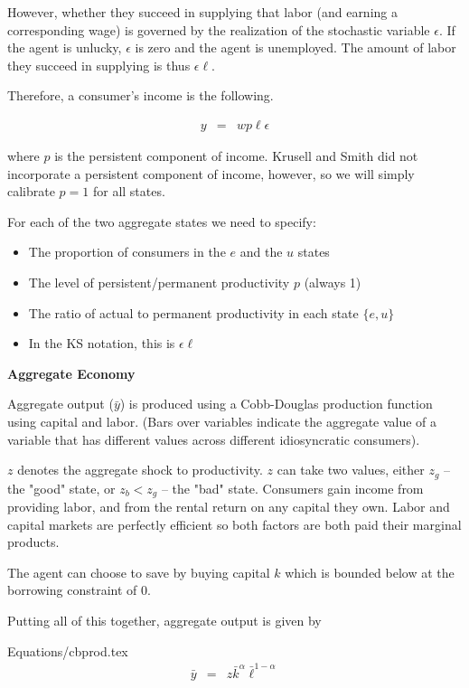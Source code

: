 \documentclass[titlepage]{\econtex}\providecommand{\texname}{KrusellSmithRep}%
\providecommand{\EqDir}{Equations}
\begin{document}
However, whether they succeed in supplying that labor (and earning a corresponding wage) is governed by the realization of the stochastic variable $\epsilon$.  If the agent is unlucky, $\epsilon$ is zero and the agent is unemployed.  The amount of labor they succeed in supplying is thus $\epsilon\ell$.

Therefore, a consumer's income is the following.

\begin{eqnarray}
y & = & w p \ell \epsilon 
\end{eqnarray}

where $p$ is the persistent component of income.  Krusell and Smith did not incorporate a persistent component of income, however, so we will simply calibrate $p=1$ for all states.

For each of the two aggregate states we need to specify:
\begin{itemize}
\item The proportion of consumers in the $e$ and the $u$ states
\item The level of persistent/permanent productivity $p$ (always 1)
\item The ratio of actual to permanent productivity in each state $\{e,u\}$
\item In the KS notation, this is $\epsilon\ell$  
\end{itemize}


\textbf{Aggregate Economy}

Aggregate output ($\bar{y}$) is produced using a Cobb-Douglas production function using capital and labor. (Bars over variables indicate the aggregate value of a variable that has different values across different idiosyncratic consumers).

$z$ denotes the aggregate shock to productivity. $z$ can take two values, either $z_g$ -- the "good" state, or $z_b < z_g$ -- the "bad" state.  Consumers gain income from providing labor, and from the rental return on any capital they own.  Labor and capital markets are perfectly efficient so both factors are both paid their marginal products.

The agent can choose to save by buying capital $k$ which is bounded below at the borrowing constraint of 0.

Putting all of this together, aggregate output is given by 

\begin{verbatimwrite}{\EqDir/cbprod.tex}
\begin{eqnarray}
  \label{eq:cbprod}
\bar{y} & = & z\bar{k}^\alpha \bar{\ell}^{1-\alpha}
\end{eqnarray}
\end{verbatimwrite}
\end{document}
